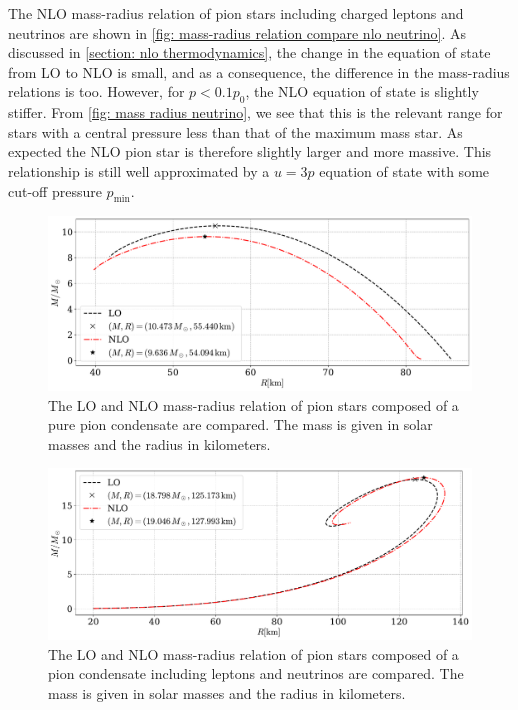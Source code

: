 The NLO mass-radius relation of pion stars including charged leptons and neutrinos are shown in \autoref{fig: mass-radius relation compare nlo neutrino}.
As discussed in \autoref{section: nlo thermodynamics}, the change in the equation of state from LO to NLO is small, and as a consequence, the difference in the mass-radius relations is too.
However, for $p < 0.1 p_0$, the NLO equation of state is slightly stiffer.
From \autoref{fig: mass radius neutrino}, we see that this is the relevant range for stars with a central pressure less than that of the maximum mass star.
As expected the NLO pion star is therefore slightly larger and more massive.
This relationship is still well approximated by a $u = 3p$ equation of state with some cut-off pressure $p_\text{min}$.


\begin{figure}[!htb]
    \centering
    \includegraphics[width=.75\textwidth]{../scripts/figurer/pion_star/mass_compare_order.pdf}
    \caption{
        The LO and NLO mass-radius relation of pion stars composed of a pure pion condensate are compared.
        The mass is given in solar masses and the radius in kilometers.}
    \label{fig: mass-radius relation compare nlo}
\end{figure}


\begin{figure}[!htb]
    \centering
    \includegraphics[width=.75\textwidth]{../scripts/figurer/pion_star/mass_compare_order_neutrino.pdf}
    \caption{
        The LO and NLO mass-radius relation of pion stars composed of a pion condensate including leptons and neutrinos are compared.
        The mass is given in solar masses and the radius in kilometers.}
    \label{fig: mass-radius relation compare nlo neutrino}
\end{figure}




